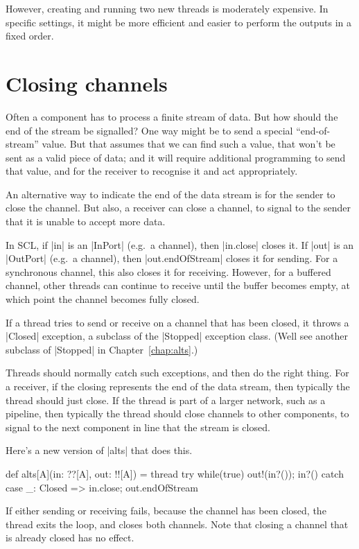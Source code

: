 However, creating and running two new threads is moderately expensive.  In
specific settings, it might be more efficient and easier to perform the
outputs in a fixed order.


\section{Closing channels}

Often a component has to process a finite stream of data.  But how should the
end of the stream be signalled?  One way might be to send a special
``end-of-stream'' value.  But that assumes that we can find such a value, that
won't be sent as a valid piece of data; and it will require additional
programming to send that value, and for the receiver to recognise it and act
appropriately. 

An alternative way to indicate the end of the data stream is for the sender to
close the channel.  But also, a receiver can close a channel, to signal to the
sender that it is unable to accept more data.

In SCL, if |in| is an |InPort| (e.g.~a channel), then |in.close| closes it.
%
If |out| is an |OutPort| (e.g.~a channel), then |out.endOfStream| closes it
for sending.  For a synchronous channel, this also closes it for receiving.
However, for a buffered channel, other threads can continue to receive until
the buffer becomes empty, at which point the channel becomes fully closed.


If a thread tries to send or receive on a channel that has been closed, it
throws a |Closed| exception, a subclass of the |Stopped| exception class.
(Well see another subclass of |Stopped| in Chapter~\ref{chap:alts}.)

Threads should normally catch such exceptions, and then do the right thing.
For a receiver, if the closing represents the end of the data stream, then
typically the thread should just close.  If the thread is part of a larger
network, such as a pipeline, then typically the thread should close channels
to other components, to signal to the next component in line that the stream
is closed.


Here's a new version of |alts| that does this.
%
\begin{scala}
def alts[A](in: ??[A], out: !![A]) = thread{ 
  try{ while(true){ out!(in?()); in?() } } 
  catch{ case _: Closed => in.close; out.endOfStream }
}
\end{scala}
% 
If either sending or receiving fails, because the channel has been closed, the
thread exits the loop, and closes both channels.  Note that closing a channel
that is already closed has no effect.

